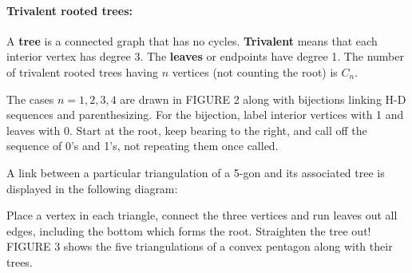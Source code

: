 \documentclass[10pt,]{book}
\newcommand{\terminology}[1]{\textbf{#1}}
\theoremstyle{plain}
\theoremstyle{definition}
\theoremstyle{definition}
\theoremstyle{definition}
\theoremstyle{definition}
\numberwithin{equation}{chapter}
\def\fivegon{%
    \coordinate (a) at (0,2.5);
    \coordinate (b) at (2,1.4);
    \coordinate (c) at (1,0);
    \coordinate (d) at (-.5,0);
    \coordinate (e) at (-2,1.5);
    \draw (a) -- (b) -- (c) -- (d) -- (e) -- (a);
  }
\newcommand{\vtx}[2]{node[fill,circle,inner sep=0pt, minimum size=4pt,label=#1:#2]{}}
\newcommand{\va}[1]{\vtx{above}{#1}}
\newcommand{\vr}[1]{\vtx{right}{#1}}
\newcommand{\vl}[1]{\vtx{left}{#1}}
\renewcommand{\v}{\vtx{above}{}}
\begin{document}
\paragraph[{Trivalent rooted trees:}]{Trivalent rooted trees:}\hypertarget{paragraphs-12}{}
\hypertarget{p-798}{}%
A \terminology{tree} is a connected graph that has no cycles. \terminology{Trivalent} means that each interior vertex has degree 3. The \terminology{leaves} or endpoints have degree 1. The number of trivalent rooted trees having \(n\) vertices (not counting the root) is \(C_n\).%
\par
\hypertarget{p-799}{}%
The cases \(n = 1, 2, 3, 4\) are drawn in FIGURE 2 along with bijections linking H-D sequences and parenthesizing. For the bijection, label interior vertices with 1 and leaves with 0. Start at the root, keep bearing to the right, and call off the sequence of 0's and 1's, not repeating them once called.%
\par
\hypertarget{p-800}{}%
A link between a particular triangulation of a 5-gon and its associated tree is displayed in the following diagram: \begin{sidebyside}{2}{0}{0}{0}
\begin{sbspanel}{0.5}
\end{sbspanel}
\begin{sbspanel}{0.5}
\end{sbspanel}
\end{sidebyside}
 Place a vertex in each triangle, connect the three vertices and run leaves out all edges, including the bottom which forms the root. Straighten the tree out! FIGURE 3 shows the five triangulations of a convex pentagon along with their trees.%
\typeout{************************************************}
\typeout{************************************************}
\end{document}
